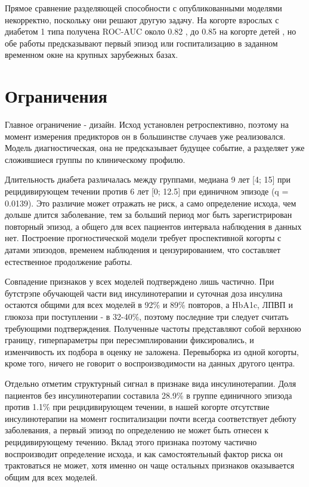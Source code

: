 \documentclass[pdflatex,sn-basic,Numbered]{sn-jnl}
\begin{document}
Прямое сравнение разделяющей способности с опубликованными моделями некорректно, поскольку они решают другую задачу. На когорте взрослых с диабетом 1 типа получена ROC-AUC около 0.82 \cite{ref11}, до 0.85 на когорте детей \cite{ref10}, но обе работы предсказывают первый эпизод или госпитализацию в заданном временном окне на крупных зарубежных базах.

\section{Ограничения}\label{sec5}

Главное ограничение - дизайн. Исход установлен ретроспективно, поэтому на момент измерения предикторов он в большинстве случаев уже реализовался. Модель диагностическая, она не предсказывает будущее событие, а разделяет уже сложившиеся группы по клиническому профилю.

Длительность диабета различалась между группами, медиана 9 лет [4; 15] при рецидивирующем течении против 6 лет [0; 12.5] при единичном эпизоде (q = 0.0139). Это различие может отражать не риск, а само определение исхода, чем дольше длится заболевание, тем за больший период мог быть зарегистрирован повторный эпизод, а общего для всех пациентов интервала наблюдения в данных нет. Построение прогностической модели требует проспективной когорты с датами эпизодов, временем наблюдения и цензурированием, что составляет естественное продолжение работы.

Совпадение признаков у всех моделей подтверждено лишь частично. При бутстрэпе обучающей части вид инсулинотерапии и суточная доза инсулина остаются общими для всех моделей в 92\% и 89\% повторов, а HbA1c, ЛПВП и глюкоза при поступлении - в 32-40\%, поэтому последние три следует считать требующими подтверждения. Полученные частоты представляют собой верхнюю границу, гиперпараметры при пересэмплировании фиксировались, и изменчивость их подбора в оценку не заложена. Перевыборка из одной когорты, кроме того, ничего не говорит о воспроизводимости на данных другого центра.

Отдельно отметим структурный сигнал в признаке вида инсулинотерапии. Доля пациентов без инсулинотерапии составила 28.9\% в группе единичного эпизода против 1.1\% при рецидивирующем течении, в нашей когорте отсутствие инсулинотерапии на момент госпитализации почти всегда соответствует дебюту заболевания, а первый эпизод по определению не может быть отнесен к рецидивирующему течению. Вклад этого признака поэтому частично воспроизводит определение исхода, и как самостоятельный фактор риска он трактоваться не может, хотя именно он чаще остальных признаков оказывается общим для всех моделей.
\end{document}
